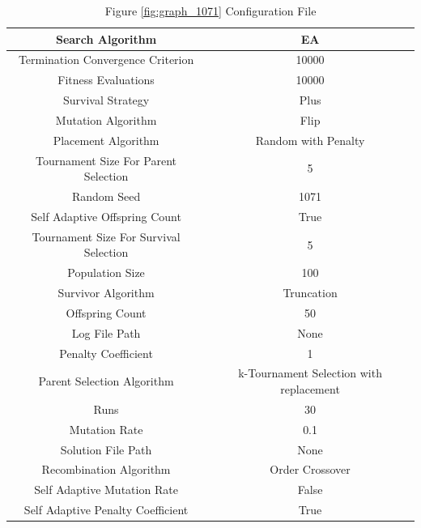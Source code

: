 \documentclass{standalone}
\begin{document}
\clearpage
\begin{table}[!htb]
	\centering
	\caption{Figure \ref{fig:graph_1071} Configuration File}
	\label{tab:graph_1071}
	\begin{tabular}{| c | c |}
		\hline
		Search Algorithm		& EA		 \\
		\hline
		Termination Convergence Criterion		& 10000		 \\
		\hline
		Fitness Evaluations		& 10000		 \\
		\hline
		Survival Strategy		& Plus		 \\
		\hline
		Mutation Algorithm		& Flip		 \\
		\hline
		Placement Algorithm		& Random with Penalty		 \\
		\hline
		Tournament Size For Parent Selection		& 5		 \\
		\hline
		Random Seed		& 1071		 \\
		\hline
		Self Adaptive Offspring Count		& True		 \\
		\hline
		Tournament Size For Survival Selection		& 5		 \\
		\hline
		Population Size		& 100		 \\
		\hline
		Survivor Algorithm		& Truncation		 \\
		\hline
		Offspring Count		& 50		 \\
		\hline
		Log File Path		& None		 \\
		\hline
		Penalty Coefficient		& 1		 \\
		\hline
		Parent Selection Algorithm		& k-Tournament Selection with replacement		 \\
		\hline
		Runs		& 30		 \\
		\hline
		Mutation Rate		& 0.1		 \\
		\hline
		Solution File Path		& None		 \\
		\hline
		Recombination Algorithm		& Order Crossover		 \\
		\hline
		Self Adaptive Mutation Rate		& False		 \\
		\hline
		Self Adaptive Penalty Coefficient		& True		 \\
		\hline
	\end{tabular}
\end{table}
\end{document}
